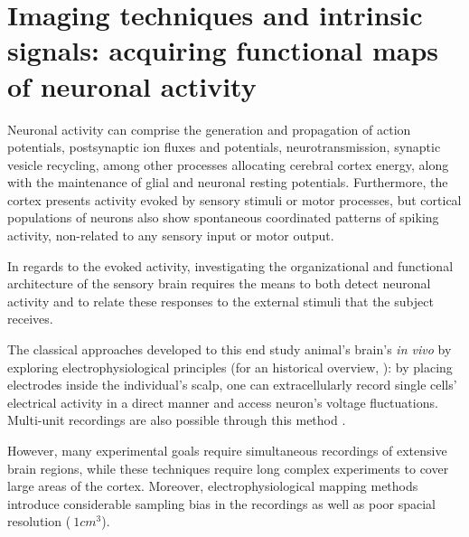 \section{Imaging techniques and intrinsic signals: acquiring functional maps of neuronal activity}

Neuronal activity can comprise the generation and propagation of action potentials, postsynaptic ion fluxes and potentials, neurotransmission, synaptic vesicle recycling, among other processes allocating cerebral cortex energy, along with the maintenance of glial and neuronal resting potentials. Furthermore, the cortex presents activity evoked by sensory stimuli or motor processes, but cortical populations of neurons also show spontaneous coordinated patterns of spiking activity, non-related to any sensory input or motor output.

In regards to the evoked activity, investigating the organizational and functional architecture of the sensory brain requires the means to both detect neuronal activity and to relate these responses to the external stimuli that the subject receives.  

 

The classical approaches developed to this end study animal's brain's \textit{in vivo} by exploring electrophysiological principles (for an historical overview, \cite{Verkhratsky2006}): by placing electrodes inside the individual's scalp, one can extracellularly record single cells' electrical activity in a direct manner and access neuron's voltage fluctuations. Multi-unit recordings are also possible through this method  .


However, many experimental goals require simultaneous recordings of extensive brain regions, while these techniques require long complex experiments to cover large areas of the cortex. Moreover, electrophysiological mapping methods introduce considerable sampling bias in the recordings as well as poor spacial resolution ($~1 cm^3$).


